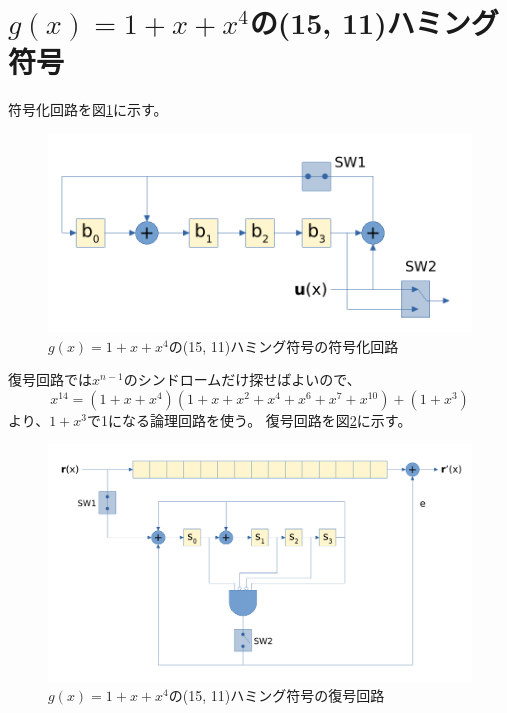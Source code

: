 \documentclass[a4paper,11pt]{jsarticle}
\begin{document}
\section{$g(x)=1+x+x^4$の(15, 11)ハミング符号}
符号化回路を図\ref{fig:hamming15-11-encoding}に示す。
\begin{figure}[htbp]
  \begin{center}
  \includegraphics[scale=1.0]{figures/hamming15-11-encoding.pdf}
  \end{center}
  \caption{$g(x)=1+x+x^4$の(15, 11)ハミング符号の符号化回路
  \label{fig:hamming15-11-encoding}
  }
\end{figure}

復号回路では$x^{n-1}$のシンドロームだけ探せばよいので、
\[
  x^{14}=(1+x+x^4)(1+x+x^2+x^4+x^6+x^7+x^{10})+(1+x^3)
\]
より、$1+x^3$で1になる論理回路を使う。
復号回路を図\ref{fig:hamming15-11-decoding}に示す。
\begin{figure}[htbp]
  \begin{center}
  \includegraphics[scale=0.6]{figures/hamming15-11-decoding.pdf}
  \end{center}
  \caption{$g(x)=1+x+x^4$の(15, 11)ハミング符号の復号回路
  \label{fig:hamming15-11-decoding}
  }
\end{figure}
\end{document}
